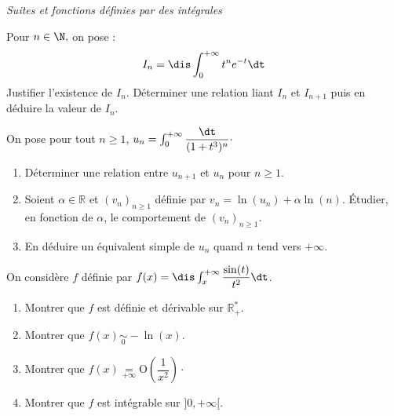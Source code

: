 \documentclass[a4paper,10pt]{report}
\begin{document}
\medskip

\begin{center}
\textit{{ {\large Suites et fonctions définies par des intégrales}}}
\end{center}

\medskip

\begin{Exa} Pour $n\in\N,$ on pose :
$$I_n=\dis\int_0^{+\infty} t^ne^{-t} \dt$$
Justifier l'existence de $I_n$. D\'eterminer une relation liant $I_n$ et $I_{n+1}$ puis en d\'eduire la valeur de $I_n.$
\end{Exa} 



\begin{Exa} On pose pour tout $n \geq 1$, $u_n = \int_{0}^{+ \infty} \dfrac{\dt}{(1+t^3)^n} \cdot$
\begin{enumerate}
\item Déterminer une relation entre $u_{n+1}$ et $u_n$ pour $n \geq 1$.
\item Soient $\alpha \in \mathbb{R}$ et $(v_n)_{n \geq 1}$ définie par $v_n = \ln(u_n) + \alpha \ln(n)$. Étudier, en fonction de $\alpha$, le comportement de $(v_n)_{n \geq 1}$.
\item En déduire un équivalent simple de $u_n$ quand $n$ tend vers $+ \infty$.
\end{enumerate}
\end{Exa} 



\begin{Exa} On considère $f$ définie par $f(x)= \dis \int_x^{+ \infty} \dfrac{\sin(t)}{t^2} \dt$.
\begin{enumerate}
\item Montrer que $f$ est définie et dérivable sur $\mathbb{R}_+^{*}$.
\item Montrer que $f(x) \underset{0}{\sim} -\ln(x)$.
\item Montrer que $f(x) \underset{+ \infty}{=} \textrm{O} \left( \dfrac{1}{x^2} \right) \cdot$
\item Montrer que $f$ est intégrable sur $]0, + \infty[$.
\end{enumerate}
\end{Exa}
\end{document}
